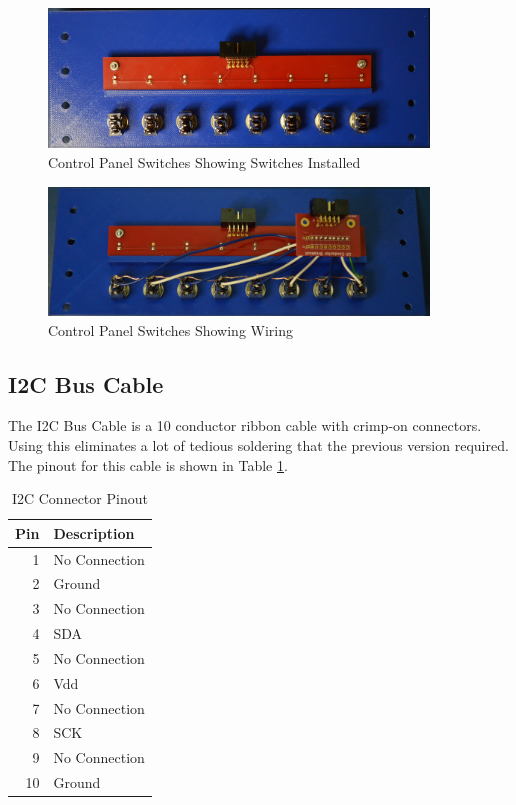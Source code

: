 \documentclass[10pt, openany]{book}
\begin{document}
\begin{figure}[ht!]
  \centering
  \includegraphics[width=0.9\textwidth]{../Pict/Switch-Installed.jpg}
  \caption{Control Panel Switches Showing Switches Installed}
  \label{fig:SwitchInstalled}
\end{figure}

\begin{figure}[ht!]
  \centering
  \includegraphics[width=0.9\textwidth]{../Pict/Switch-Wired.jpg}
  \caption{Control Panel Switches Showing Wiring}
  \label{fig:SwitchWired}
\end{figure}

\subsection{I2C Bus Cable}
The I2C Bus Cable is a 10 conductor ribbon cable with crimp-on connectors.  Using this eliminates a lot of tedious soldering that the previous version required.  The pinout for this cable is shown in Table \ref{tbl:I2C-Pins}.

\begin{table}
  \caption{I2C Connector Pinout}
  \label{tbl:I2C-Pins}
  \centering
  \begin{tabular}{|r|l|}
    \hline
    Pin & Description\\
    \hline
    1 & No Connection\\
    2 & Ground\\
    3 & No Connection\\
    4 & SDA\\
    5 & No Connection\\
    6 & Vdd\\
    7 & No Connection\\
    8 & SCK\\
    9 & No Connection\\
    10 & Ground\\
    \hline
  \end{tabular}
\end{table}
\end{document}
